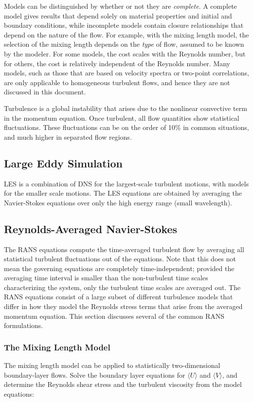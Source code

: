 \documentclass[10pt]{article}
\newcommand{\la}{\langle}
\newcommand{\ra}{\rangle}
\begin{document}
\begin{flushleft}
Models can be distinguished by whether or not they are \textit{complete}. A complete model gives results that depend solely on material properties and initial and boundary conditions, while incomplete models contain closure relationships that depend on the nature of the flow. For example, with the mixing length model, the selection of the mixing length depends on the \textit{type} of flow, assumed to be known by the modeler. For some models, the cost scales with the Reynolds number, but for others, the cost is relatively independent of the Reynolds number. Many models, such as those that are based on velocity spectra or two-point correlations, are only applicable to homogeneous turbulent flows, and hence they are not discussed in this document. 

Turbulence is a global instability that arises due to the nonlinear convective term in the momentum equation. Once turbulent, all flow quantities show statistical fluctuations. These fluctuations can be on the order of 10\% in common situations, and much higher in separated flow regions.

\subsection{Large Eddy Simulation}
LES is a combination of DNS for the largest-scale turbulent motions, with models for the smaller scale motions. The LES equations are obtained by averaging the Navier-Stokes equations over only the high energy range (small wavelength). 

\subsection{Reynolds-Averaged Navier-Stokes}
The RANS equations compute the time-averaged turbulent flow by averaging all statistical turbulent fluctuations out of the equations. Note that this does not mean the governing equations are completely time-independent; provided the averaging time interval is smaller than the non-turbulent time scales characterizing the system, only the turbulent time scales are averaged out. The RANS equations consist of a large subset of different turbulence models that differ in how they model the Reynolds stress terms that arise from the averaged momentum equation. This section discusses several of the common RANS formulations.

\subsubsection{The Mixing Length Model}
The mixing length model can be applied to statistically two-dimensional boundary-layer flows. Solve the boundary layer equations for \(\la U\ra\) and \(\la V\ra\), and determine the Reynolds shear stress and the turbulent viscosity from the model equations:


\end{flushleft}
\end{document}
